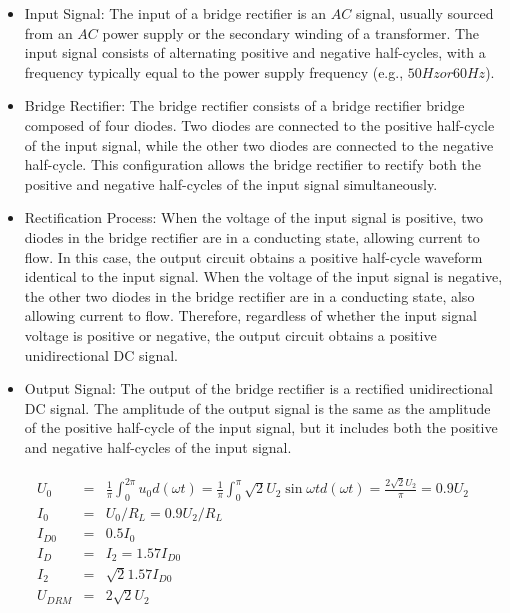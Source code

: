 \documentclass[UTF8]{article}
\begin{document}
  \begin{itemize}
  \item Input Signal: The input of a bridge rectifier is an $AC$ signal, usually sourced from an $AC$ power supply or the secondary winding of a transformer. The input signal consists of alternating positive and negative half-cycles, with a frequency typically equal to the power supply frequency (e.g., $50Hz or 60Hz$).
  
  \item Bridge Rectifier: The bridge rectifier consists of a bridge rectifier bridge composed of four diodes. Two diodes are connected to the positive half-cycle of the input signal, while the other two diodes are connected to the negative half-cycle. This configuration allows the bridge rectifier to rectify both the positive and negative half-cycles of the input signal simultaneously.
  
  \item Rectification Process: When the voltage of the input signal is positive, two diodes in the bridge rectifier are in a conducting state, allowing current to flow. In this case, the output circuit obtains a positive half-cycle waveform identical to the input signal. When the voltage of the input signal is negative, the other two diodes in the bridge rectifier are in a conducting state, also allowing current to flow. Therefore, regardless of whether the input signal voltage is positive or negative, the output circuit obtains a positive unidirectional DC signal.
  
  \item Output Signal: The output of the bridge rectifier is a rectified unidirectional DC signal. The amplitude of the output signal is the same as the amplitude of the positive half-cycle of the input signal, but it includes both the positive and negative half-cycles of the input signal.
   
  \end{itemize}     
   
   \begin{eqnarray}
       \begin{matrix}
        U_{0}&=&\frac{1}{\pi} \int_{0}^{2 \pi} u_{0} d(\omega t)=\frac{1}{\pi} \int_{0}^{\pi} \sqrt{2} U_{2} \sin \omega t d(\omega t)=\frac{ 2\sqrt{2} U_{2}}{\pi}=0.9 U_{2}\\
        I_{0}&=&U_{0} / R_{L}=0.9 U_{2} / R_{L}\\
        I_{D0} &=& 0.5I_0\\
        I_{D}&=&I_{2} =1.57I_{D0}\\
        I_2 &=& \sqrt{2} 1.57I_{D0}\\
        U_{D R M}&=&2\sqrt{2} U_{2}
       \end{matrix}
   \end{eqnarray}    
  
\end{document}
